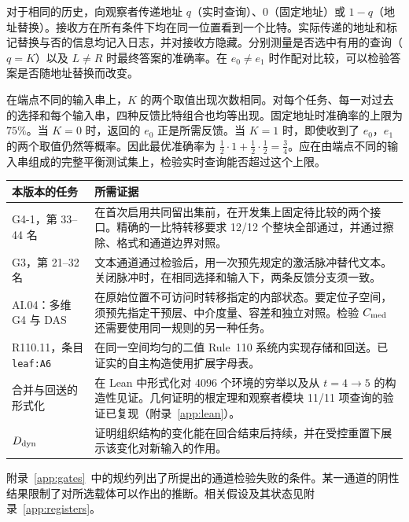 对于相同的历史，向观察者传递地址 $q$（实时查询）、$0$（固定地址）或 $1-q$（地址替换）。接收方在所有条件下均在同一位置看到一个比特。实际传递的地址和标记替换与否的信息均记入日志，并对接收方隐藏。分别测量是否选中有用的查询（$q=K$）以及 $L\ne R$ 时最终答案的准确率。在 $e_0\ne e_1$ 时作配对比较，可以检验答案是否随地址替换而改变。

在端点不同的输入串上，$K$ 的两个取值出现次数相同。对每个任务、每一对过去的选择和每个输入串，四种反馈比特组合也均等出现。固定地址时准确率的上限为 $75\%$。当 $K=0$ 时，返回的 $e_0$ 正是所需反馈。当 $K=1$ 时，即使收到了 $e_0$，$e_1$ 的两个取值仍然等概率。因此最优准确率为 $\tfrac12\cdot1+\tfrac12\cdot\tfrac12=\tfrac34$。应在由端点不同的输入串组成的完整平衡测试集上，检验实时查询能否超过这个上限。

\begin{center}\small
\begin{tabularx}{\linewidth}{@{}p{.23\linewidth}X@{}}\toprule
本版本的任务 & 所需证据 \\\midrule
G4-1，第 33--44 名 & 在首次启用共同留出集前，在开发集上固定待比较的两个接口。精确的一比特转移要求 12/12 个整块全部通过，并通过擦除、格式和通道边界对照。\\
G3，第 21--32 名 & 文本通道通过检验后，用一次预先规定的激活脉冲替代文本。关闭脉冲时，在相同选择和输入下，两条反馈分支须一致。\\
AI.04：多维 G4 与 DAS & 在原始位置不可访问时转移指定的内部状态。要定位子空间，须预先指定干预层、中介度量、容差和独立对照。检验 $C_{\rm med}$ 还需要使用同一规则的另一种任务。\\
R110.11，条目 \texttt{leaf:A6} & 在同一空间均匀的二值 Rule~110 系统内实现存储和回送。已证实的自主构造使用扩展字母表。\\
合并与回送的形式化 & 在 Lean 中形式化对 4096 个环境的穷举以及从 $t=4\to5$ 的构造性见证。几何证明的根定理和观察者模块 11/11 项查询的验证已复现（附录~\ref{app:lean}）。\\
$D_{\rm dyn}$ & 证明组织结构的变化能在回合结束后持续，并在受控重置下展示该变化对新输入的作用。\\
\bottomrule\end{tabularx}
\end{center}
附录~\ref{app:gates}~中的规约列出了所提出的通道检验失败的条件。某一通道的阴性结果限制了对所选载体可以作出的推断。相关假设及其状态见附录~\ref{app:registers}。

